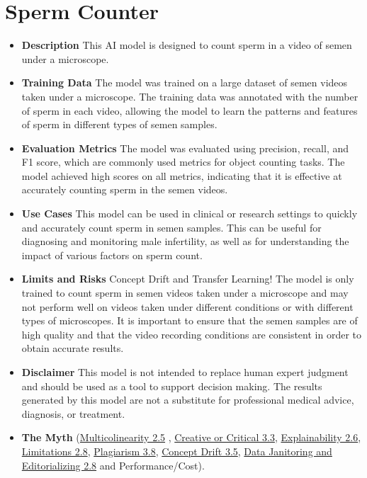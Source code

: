 \section{Sperm Counter}

\begin{itemize}
    \item \textbf{Description} This AI model is designed to count sperm in a video of semen under a microscope.
    \item \textbf{Training Data} The model was trained on a large dataset of semen videos taken under a microscope. The training data was annotated with the number of sperm in each video, allowing the model to learn the patterns and features of sperm in different types of semen samples.
    \item \textbf{Evaluation Metrics} The model was evaluated using precision, recall, and F1 score, which are commonly used metrics for object counting tasks. The model achieved high scores on all metrics, indicating that it is effective at accurately counting sperm in the semen videos.
    \item \textbf{Use Cases} This model can be used in clinical or research settings to quickly and accurately count sperm in semen samples. This can be useful for diagnosing and monitoring male infertility, as well as for understanding the impact of various factors on sperm count.
    \item \textbf{Limits and Risks} Concept Drift and Transfer Learning! The model is only trained to count sperm in semen videos taken under a microscope and may not perform well on videos taken under different conditions or with different types of microscopes. It is important to ensure that the semen samples are of high quality and that the video recording conditions are consistent in order to obtain accurate results.
    \item \textbf{Disclaimer} This model is not intended to replace human expert judgment and should be used as a tool to support decision making. The results generated by this model are not a substitute for professional medical advice, diagnosis, or treatment.
    \item \textbf{The Myth} (\hyperref[sec:multi]{Multicolinearity 2.5} , \hyperref[sec:creative]{Creative or Critical 3.3}, \hyperref[sec:explain]{Explainability 2.6}, \hyperref[sec:limits]{Limitations 2.8}, \hyperref[sec:plag]{Plagiarism 3.8}, \hyperref[sec:drift]{Concept Drift 3.5}, \hyperref[sec:janitor]{Data Janitoring and Editorializing 2.8} and Performance/Cost).
\end{itemize}

